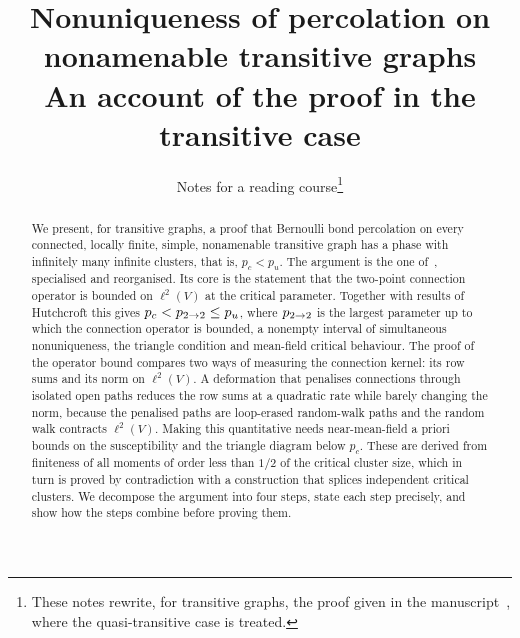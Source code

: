 \documentclass[11pt]{article}
\title{Nonuniqueness of percolation on nonamenable transitive graphs\\[0.4em]
  \large An account of the proof in the transitive case}
\author{Notes for a reading course\thanks{These notes rewrite,
  for transitive graphs, the proof given in the manuscript~\cite{Ope26}, where the quasi-transitive
  case is treated.}}
\date{}
\begin{document}
\maketitle

\begin{abstract}
We present, for transitive graphs, a proof that Bernoulli bond percolation on every connected,
locally finite, simple, nonamenable transitive graph has a phase with infinitely many infinite
clusters, that is, $p_c<p_u$. The argument is the one of~\cite{Ope26}, specialised and reorganised.
Its core is the statement that the two-point connection operator is bounded on $\ell^2(V)$ at the
critical parameter. Together with results of Hutchcroft this gives $p_c<p_{2\to 2}\le p_u$, where $p_{2\to 2}$ is
the largest parameter up to which the connection operator is bounded, a nonempty interval of
simultaneous nonuniqueness, the triangle condition and mean-field critical behaviour. The proof of
the operator bound compares two ways of measuring the connection kernel: its row sums and its norm on
$\ell^2(V)$. A deformation that penalises connections through isolated open paths reduces the row
sums at a quadratic rate while barely changing the norm, because the penalised paths are
loop-erased random-walk paths and the random walk contracts $\ell^2(V)$. Making this quantitative
needs near-mean-field a priori bounds on the susceptibility and the triangle diagram below $p_c$.
These are derived from finiteness of all moments of order less than $1/2$ of the critical cluster
size, which in turn is proved by contradiction with a construction that splices independent
critical clusters. We decompose the argument into four steps, state each step precisely, and show
how the steps combine before proving them.
\end{abstract}
\clearpage

\tableofcontents
\clearpage













\appendix




\end{document}
